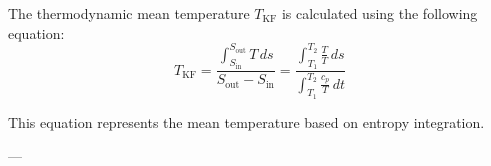 The thermodynamic mean temperature \( T_{\text{KF}} \) is calculated using the following equation:  
\[
T_{\text{KF}} = \frac{\int_{S_{\text{in}}}^{S_{\text{out}}} T \, ds}{S_{\text{out}} - S_{\text{in}}} = \frac{\int_{T_1}^{T_2} \frac{T}{T} \, ds}{\int_{T_1}^{T_2} \frac{c_p}{T} \, dt}
\]  

This equation represents the mean temperature based on entropy integration.

---